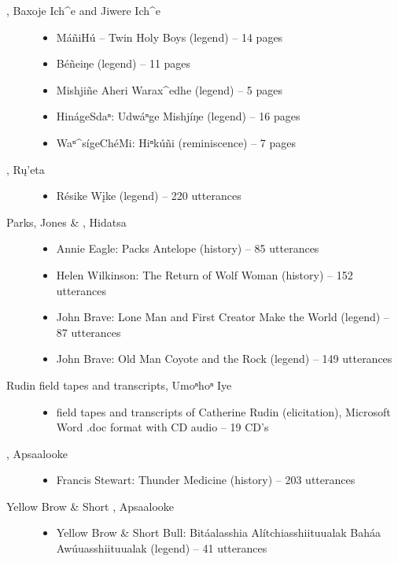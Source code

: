 \documentclass[output=paper]{LSP/langsci}
\begin{document}
\begin{description}
\item[\citet{Marsh1936}, Baxoje Ich\^{}e and Jiwere Ich\^{}e]\hfill
\begin{itemize}
\item MáñiHú -- Twin Holy Boys (legend) -- 14 pages
\item Béñeiŋe (legend) -- 11 pages
\item Mishjiñe Aheri Warax\^{}edhe (legend) -- 5 pages
\item HinágeSdaⁿ: Udwáⁿge Mishjíŋe (legend) -- 16 pages
\item Waⁿ\^{}sígeChéMi: Hiⁿkúñi (reminiscence) -- 7 pages
\end{itemize}

\item[\citet{Mixco1997}, Rų’eta]\hfill
\begin{itemize}
\item Résike Wįke (legend) -- 220 utterances
\end{itemize}

\item[Parks, Jones \& \citet{Hollow1978}, Hidatsa]\hfill
\begin{itemize}
\item Annie Eagle: Packs Antelope (history) -- 85 utterances
\item Helen Wilkinson: The Return of Wolf Woman (history) -- 152 utterances
\item John Brave: Lone Man and First Creator Make the World (legend) -- 87 utterances
\item John Brave: Old Man Coyote and the Rock (legend) -- 149 utterances
\end{itemize}

\item[Rudin field tapes and transcripts, Umoⁿhoⁿ Iye]\hfill
\begin{itemize}
\item field tapes and transcripts of Catherine Rudin (elicitation), Microsoft Word .doc format with CD audio -- 19 CD’s
\end{itemize}

\item[\citet{Wallace1993}, Apsaalooke]\hfill
\begin{itemize}
\item Francis Stewart: Thunder Medicine (history) -- 203 utterances
\end{itemize}

\item[Yellow Brow \& Short \citet{Bull1980}, Apsaalooke]\hfill
\begin{itemize}
\item Yellow Brow \& Short Bull: Bitáalasshia Alítchiasshiituualak Baháa Awúuasshiituualak (legend) -- 41 utterances
\end{itemize}

\end{description}
\end{document}
